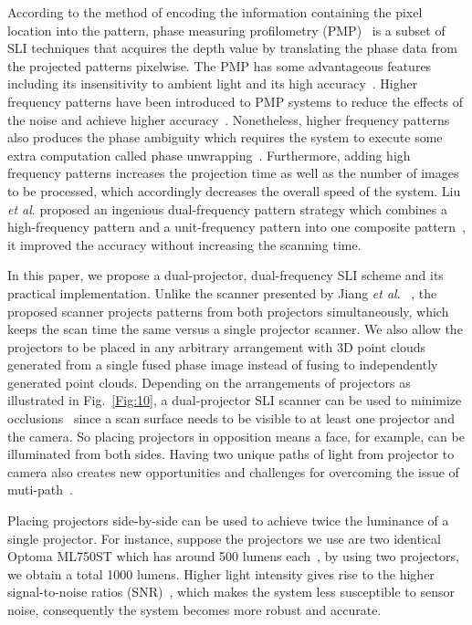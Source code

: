 \documentclass[]{spie}  %
\begin{document}
According to the method of encoding the information containing the pixel location into the pattern, phase measuring profilometry (PMP)~\cite{srin85} is a subset of SLI techniques that acquires the depth value by translating the phase data from the projected patterns pixelwise. The PMP has some advantageous features including its insensitivity to ambient light and its high accuracy~\cite{guan03, hali89}. Higher frequency patterns have been introduced to PMP systems to reduce the effects of the noise and achieve higher accuracy~\cite{lijl03}. Nonetheless, higher frequency patterns also produces the phase ambiguity which requires the system to execute some extra computation called phase unwrapping~\cite{song18}. Furthermore, adding high frequency patterns increases the projection time as well as the number of images to be processed, which accordingly decreases the overall speed of the system. Liu \textit{et al}. proposed an ingenious dual-frequency pattern strategy which combines a high-frequency pattern and a unit-frequency pattern into one composite pattern~\cite{liuk10}, it improved the accuracy without increasing the scanning time.

In this paper, we propose a dual-projector, dual-frequency SLI scheme and its practical implementation. Unlike the scanner presented by Jiang \textit{et al}. ~\cite{jian18}, the proposed scanner projects patterns from both projectors simultaneously, which keeps the scan time the same versus a single projector scanner.  We also allow the projectors to be placed in any arbitrary arrangement with 3D point clouds generated from a single fused phase image instead of fusing to independently generated point clouds. Depending on the arrangements of projectors as illustrated in Fig.~\ref{Fig:10}, a dual-projector SLI scanner can be used to minimize occlusions~\cite{linj13} since a scan surface needs to be visible to at least one projector and the camera.  So placing projectors in opposition means a face, for example, can be illuminated from both sides.  Having two unique paths of light from projector to camera also creates new opportunities and challenges for overcoming the issue of muti-path~\cite{otoo16}. 

Placing projectors side-by-side can be used to achieve twice the luminance of a single projector. For instance, suppose the projectors we use are two identical Optoma ML750ST which has around 500 lumens each~\cite{lume70}, by using two projectors, we obtain a total 1000 lumens. Higher light intensity gives rise to the higher signal-to-noise ratios (SNR)~\cite{wangy10}, which makes the system less susceptible to sensor noise, consequently the system becomes more robust and accurate.
\end{document}
